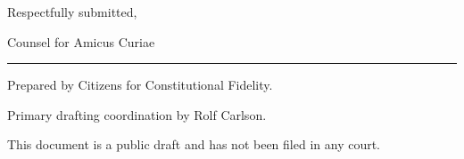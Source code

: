 \documentclass[12pt]{article}
\begin{document}
\vspace{1.5em}

Respectfully submitted,

\vspace{1.5em}

Counsel for Amicus Curiae

\vspace{1.5em}

\noindent\rule{0.4\linewidth}{0.4pt}

\small
Prepared by Citizens for Constitutional Fidelity.

Primary drafting coordination by Rolf Carlson.

This document is a public draft and has not been filed in any court.
\normalsize
\end{document}
